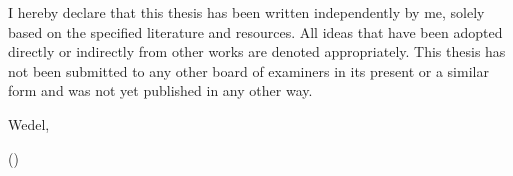 \label{cha:aff}
I hereby declare that this thesis has been written independently by me, solely based on the specified literature and resources. All ideas that have been adopted directly or indirectly from other works are denoted appropriately. This thesis has not been submitted to any other board of examiners in its present or a similar form and was not yet published in any other way.

\bigskip

Wedel, \Datum

\vspace{5ex}

\begin{center}
(\Author)
\end{center}
